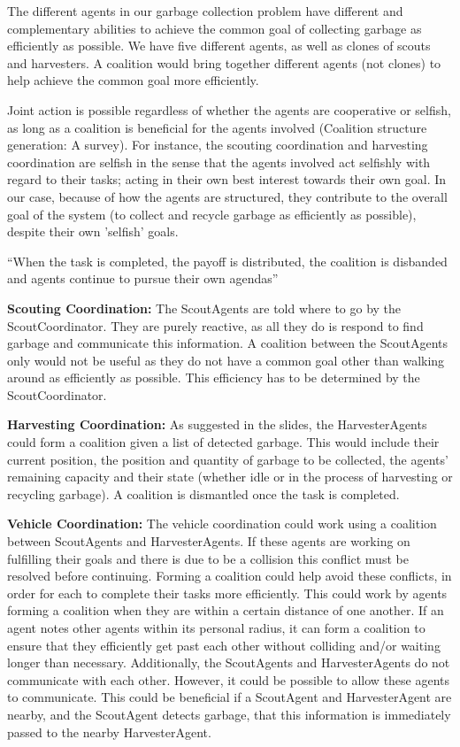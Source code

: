 The different agents in our garbage collection problem have different and complementary abilities to achieve the common goal of collecting garbage as efficiently as possible. We have five different agents, as well as clones of scouts and harvesters. A coalition would bring together different agents (not clones) to help achieve the common goal more efficiently.
 
Joint action is possible regardless of whether the agents are cooperative or selfish, as long as a coalition is beneficial for the agents involved (Coalition structure generation: A survey).  For instance, the scouting coordination and harvesting coordination are selfish in the sense that the agents involved act selfishly with regard to their tasks; acting in their own best interest towards their own goal. In our case, because of how the agents are structured, they contribute to the overall goal of the system (to collect and recycle garbage as efficiently as possible), despite their own 'selfish' goals.
 
``When the task is completed, the payoff is distributed, the coalition is disbanded and agents continue to pursue their own agendas''

\textbf{Scouting Coordination:} The ScoutAgents are told where to go by the ScoutCoordinator. They are purely reactive, as all they do is respond to find garbage and communicate this information. A coalition between the ScoutAgents only would not be useful as they do not have a common goal other than walking around as efficiently as possible. This efficiency has to be determined by the ScoutCoordinator.  

\textbf{Harvesting Coordination:} As suggested in the slides, the HarvesterAgents could form a coalition given a list of detected garbage. This would include their current position, the position and quantity of garbage to be collected, the agents' remaining capacity and their state (whether idle or in the process of harvesting or recycling garbage). A coalition is dismantled once the task is completed.

\textbf{Vehicle Coordination:} The vehicle coordination could work using a coalition between ScoutAgents and HarvesterAgents. If these agents are working on fulfilling their goals and there is due to be a collision this conflict must be resolved before continuing. Forming a coalition could help avoid these conflicts, in order for each to complete their tasks more efficiently. This could work by agents forming a coalition when they are within a certain distance of one another. If an agent notes other agents within its personal radius, it can form a coalition to ensure that they efficiently get past each other without colliding and/or waiting longer than necessary. Additionally, the ScoutAgents and HarvesterAgents do not communicate with each other. However, it could be possible to allow these agents to communicate. This could be beneficial if a ScoutAgent and HarvesterAgent are nearby, and the ScoutAgent detects garbage, that this information is immediately passed to the nearby HarvesterAgent. 

